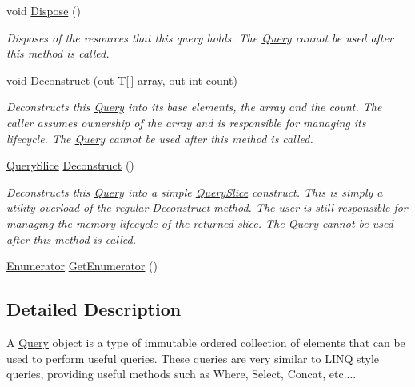 \begin{DoxyCompactItemize}
void \mbox{\hyperlink{struct_leap_1_1_unity_1_1_query_1_1_query_a4c333e8a0bb14c3237fa65d2ad308c5a}{Dispose}} ()
\begin{DoxyCompactList}\small\item\em Disposes of the resources that this query holds. The \mbox{\hyperlink{struct_leap_1_1_unity_1_1_query_1_1_query}{Query}} cannot be used after this method is called. \end{DoxyCompactList}\item 
void \mbox{\hyperlink{struct_leap_1_1_unity_1_1_query_1_1_query_a411e47e60b7ae4d9df1d64f280feb617}{Deconstruct}} (out T\mbox{[}$\,$\mbox{]} array, out int count)
\begin{DoxyCompactList}\small\item\em Deconstructs this \mbox{\hyperlink{struct_leap_1_1_unity_1_1_query_1_1_query}{Query}} into its base elements, the array and the count. The caller assumes ownership of the array and is responsible for managing its lifecycle. The \mbox{\hyperlink{struct_leap_1_1_unity_1_1_query_1_1_query}{Query}} cannot be used after this method is called. \end{DoxyCompactList}\item 
\mbox{\hyperlink{struct_leap_1_1_unity_1_1_query_1_1_query_1_1_query_slice}{Query\+Slice}} \mbox{\hyperlink{struct_leap_1_1_unity_1_1_query_1_1_query_a945832fdab8203804442a9d043ea55cf}{Deconstruct}} ()
\begin{DoxyCompactList}\small\item\em Deconstructs this \mbox{\hyperlink{struct_leap_1_1_unity_1_1_query_1_1_query}{Query}} into a simple \mbox{\hyperlink{struct_leap_1_1_unity_1_1_query_1_1_query_1_1_query_slice}{Query\+Slice}} construct. This is simply a utility overload of the regular Deconstruct method. The user is still responsible for managing the memory lifecycle of the returned slice. The \mbox{\hyperlink{struct_leap_1_1_unity_1_1_query_1_1_query}{Query}} cannot be used after this method is called. \end{DoxyCompactList}\item 
\mbox{\hyperlink{struct_leap_1_1_unity_1_1_query_1_1_query_1_1_enumerator}{Enumerator}} \mbox{\hyperlink{struct_leap_1_1_unity_1_1_query_1_1_query_a754dd1572406e8be39111c186daa1b74}{Get\+Enumerator}} ()
\end{DoxyCompactItemize}


\subsection{Detailed Description}
A \mbox{\hyperlink{struct_leap_1_1_unity_1_1_query_1_1_query}{Query}} object is a type of immutable ordered collection of elements that can be used to perform useful queries. These queries are very similar to L\+I\+NQ style queries, providing useful methods such as Where, Select, Concat, etc.... 

